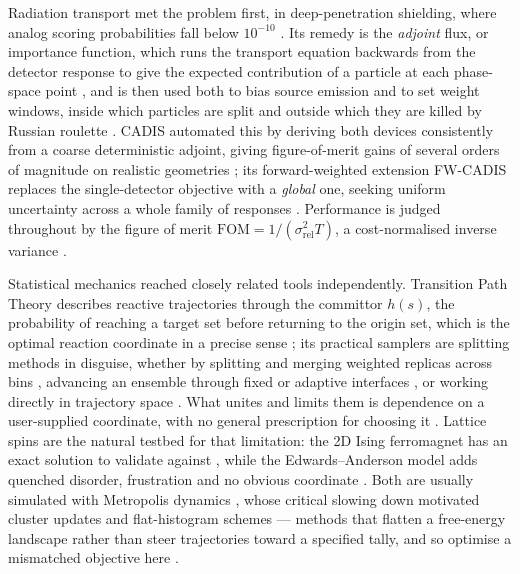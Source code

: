 \documentclass[a4paper,fleqn]{cas-sc}
\begin{document}
	Radiation transport met the problem first, in deep-penetration shielding, where analog
	scoring probabilities fall below $10^{-10}$ \cite{spanier1969, wagner1998}. Its remedy is the
	\emph{adjoint} flux, or importance function, which runs the transport equation backwards from
	the detector response to give the expected contribution of a particle at each phase-space
	point \cite{lewins1965, bell1970}, and is then used both to bias source emission and to set
	weight windows, inside which particles are split and outside which they are killed by Russian
	roulette \cite{kahn1951, booth1984}. CADIS automated this by deriving both devices
	consistently from a coarse deterministic adjoint, giving figure-of-merit gains of several
	orders of magnitude on realistic geometries \cite{wagner1998, haghighat2003}; its
	forward-weighted extension FW-CADIS replaces the single-detector objective with a
	\emph{global} one, seeking uniform uncertainty across a whole family of responses
	\cite{wagnerfw2014, cooper2001}. Performance is judged throughout by the figure of merit
	$\mathrm{FOM}=1/(\sigma_{\mathrm{rel}}^{2}T)$, a cost-normalised inverse variance
	\cite{spanier1969, wagnerfw2014}.
	
	Statistical mechanics reached closely related tools independently. Transition Path Theory
	describes reactive trajectories through the committor $h(s)$, the probability of reaching a
	target set before returning to the origin set, which is the optimal reaction coordinate in a
	precise sense \cite{e2006, metzner2009, evanden2010}; its practical samplers are splitting
	methods in disguise, whether by splitting and merging weighted replicas across bins
	\cite{huber1996, zhang2010}, advancing an ensemble through fixed or adaptive interfaces
	\cite{allen2009, cerou2007}, or working directly in trajectory space \cite{bolhuis2002}. What
	unites and limits them is dependence on a user-supplied coordinate, with no general
	prescription for choosing it \cite{zuckerman2017, allen2009}. Lattice spins are the natural
	testbed for that limitation: the 2D Ising ferromagnet \cite{ising1925} has an exact solution
	to validate against \cite{onsager1944}, while the Edwards--Anderson model adds quenched
	disorder, frustration and no obvious coordinate \cite{edwards1975, binder1986}. Both are
	usually simulated with Metropolis dynamics \cite{metropolis1953}, whose critical slowing down
	motivated cluster updates \cite{swendsen1987, wolff1989} and flat-histogram schemes
	\cite{berg1992, wanglandau2001} --- methods that flatten a free-energy landscape rather than
	steer trajectories toward a specified tally, and so optimise a mismatched objective here
	\cite{wanglandau2001}.
	
\end{document}
